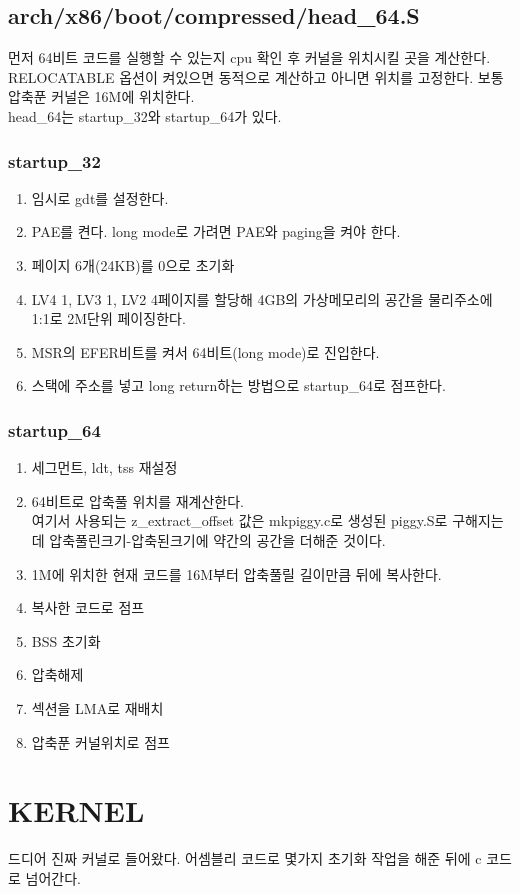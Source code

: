 \documentclass[a4paper,11pt]{report}
\begin{document}
\begin{CJK}{UTF8}{}
\section{arch/x86/boot/compressed/head\_64.S}
먼저 64비트 코드를 실행할 수 있는지 cpu 확인 후 커널을 위치시킬 곳을 계산한다. RELOCATABLE 옵션이 켜있으면 동적으로 계산하고 아니면 위치를 고정한다. 보통 압축푼 커널은 16M에 위치한다.\\
head\_64는 startup\_32와 startup\_64가 있다.

\subsection{startup\_32}
\begin{enumerate}
\item 임시로 gdt를 설정한다.
\item PAE를 켠다. long mode로 가려면 PAE와 paging을 켜야 한다.
\item 페이지 6개(24KB)를 0으로 초기화
\item LV4 1, LV3 1, LV2 4페이지를 할당해 4GB의 가상메모리의 공간을 물리주소에 1:1로 2M단위 페이징한다.
\item MSR의 EFER비트를 켜서 64비트(long mode)로 진입한다.
\item 스택에 주소를 넣고 long return하는 방법으로 startup\_64로 점프한다.
\end{enumerate}

\subsection{startup\_64}
\begin{enumerate}
\item 세그먼트, ldt, tss 재설정
\item 64비트로 압축풀 위치를 재계산한다.\\
여기서 사용되는 z\_extract\_offset 값은 mkpiggy.c로 생성된 piggy.S로 구해지는데 압축풀린크기-압축된크기에 약간의 공간을 더해준 것이다.
\item 1M에 위치한 현재 코드를 16M부터 압축풀릴 길이만큼 뒤에 복사한다.
\item 복사한 코드로 점프
\item BSS 초기화
\item 압축해제
\item 섹션을 LMA로 재배치
\item 압축푼 커널위치로 점프
\end{enumerate}

\chapter{KERNEL}
드디어 진짜 커널로 들어왔다.
어셈블리 코드로 몇가지 초기화 작업을 해준 뒤에 c 코드로 넘어간다.

\end{CJK}
\end{document}

